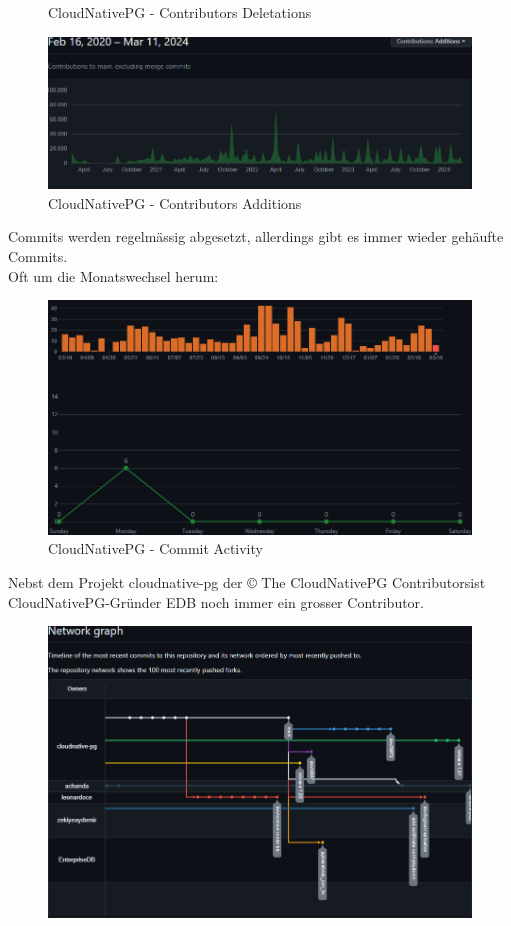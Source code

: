 \begin{flushleft}
\begin{figure}[H]
        \caption{CloudNativePG - Contributors Deletations}
        \label{fig:contributors_deletations_cloudnative-pg_cloudnative-pg}
    \end{figure}
    \begin{figure}[H]
        \centering
        \includegraphics[width=0.75\linewidth]{source/implementation/evaluation/postgresql_ha_solutions/insights/cloudnativepg/contributors_additions_cloudnative-pg_cloudnative-pg}
        \caption{CloudNativePG - Contributors Additions}
        \label{fig:contributors_additions_cloudnative-pg_cloudnative-pg}
    \end{figure}
    Commits werden regelmässig abgesetzt, allerdings gibt es immer wieder gehäufte Commits.\\
    Oft um die Monatswechsel herum:
    \begin{figure}[H]
        \centering
        \includegraphics[width=0.75\linewidth]{source/implementation/evaluation/postgresql_ha_solutions/insights/cloudnativepg/commit_activity_cloudnative-pg_cloudnative-pg}
        \caption{CloudNativePG - Commit Activity}
        \label{fig:commit_activity_cloudnative-pg_cloudnative-pg}
    \end{figure}
    Nebst dem Projekt cloudnative-pg der \guillemotleft© The CloudNativePG Contributors\guillemotright ist CloudNativePG-Gründer EDB noch immer ein grosser Contributor.
     \begin{figure}[H]
        \centering
        \includegraphics[width=0.75\linewidth]{source/implementation/evaluation/postgresql_ha_solutions/insights/cloudnativepg/network_graph_cloudnative-pg_cloudnative-pg}

\end{figure}
\end{flushleft}
